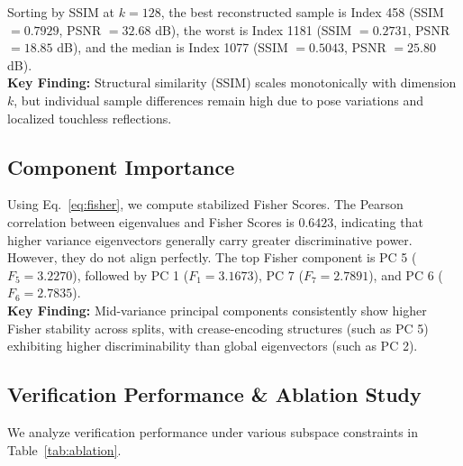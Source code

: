 \documentclass[conference]{IEEEtran}
\begin{document}
Sorting by SSIM at $k=128$, the best reconstructed sample is Index 458 (SSIM $= 0.7929$, PSNR $= 32.68$ dB), the worst is Index 1181 (SSIM $= 0.2731$, PSNR $= 18.85$ dB), and the median is Index 1077 (SSIM $= 0.5043$, PSNR $= 25.80$ dB).
\\
\textbf{Key Finding:} Structural similarity (SSIM) scales monotonically with dimension $k$, but individual sample differences remain high due to pose variations and localized touchless reflections.

\subsection{Component Importance}
Using Eq.~\ref{eq:fisher}, we compute stabilized Fisher Scores. The Pearson correlation between eigenvalues and Fisher Scores is $0.6423$, indicating that higher variance eigenvectors generally carry greater discriminative power. However, they do not align perfectly. The top Fisher component is PC 5 ($F_5 = 3.2270$), followed by PC 1 ($F_1 = 3.1673$), PC 7 ($F_7 = 2.7891$), and PC 6 ($F_6 = 2.7835$).
\\
\textbf{Key Finding:} Mid-variance principal components consistently show higher Fisher stability across splits, with crease-encoding structures (such as PC 5) exhibiting higher discriminability than global eigenvectors (such as PC 2).

\subsection{Verification Performance & Ablation Study}
We analyze verification performance under various subspace constraints in Table~\ref{tab:ablation}. 
\end{document}
